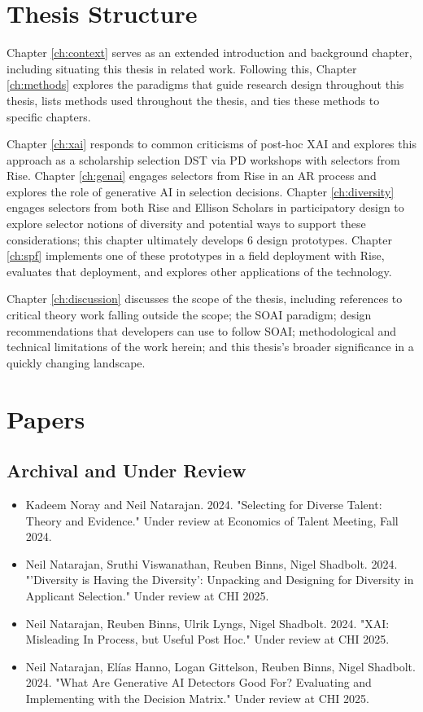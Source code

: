 \section{Thesis Structure}
Chapter \ref{ch:context} serves as an extended introduction and background chapter, including situating this thesis in related work. Following this, Chapter \ref{ch:methods} explores the paradigms that guide research design throughout this thesis, lists methods used throughout the thesis, and ties these methods to specific chapters.

Chapter \ref{ch:xai} responds to common criticisms of post-hoc XAI and explores this approach as a scholarship selection DST via PD workshops with selectors from Rise. Chapter \ref{ch:genai} engages selectors from Rise in an AR process and explores the role of generative AI in selection decisions. Chapter \ref{ch:diversity} engages selectors from both Rise and Ellison Scholars in participatory design to explore selector notions of diversity and potential ways to support these considerations; this chapter ultimately develops 6 design prototypes. Chapter \ref{ch:spf} implements one of these prototypes in a field deployment with Rise, evaluates that deployment, and explores other applications of the technology.

Chapter \ref{ch:discussion} discusses the scope of the thesis, including references to critical theory work falling outside the scope; the SOAI paradigm; design recommendations that developers can use to follow SOAI; methodological and technical limitations of the work herein; and this thesis's broader significance in a quickly changing landscape. 

\section{Papers}
\subsection{Archival and Under Review}
\begin{itemize}
    \item Kadeem Noray and Neil Natarajan. 2024. "Selecting for Diverse Talent: Theory and Evidence." Under review at Economics of Talent Meeting, Fall 2024.
    \item Neil Natarajan, Sruthi Viswanathan, Reuben Binns, Nigel Shadbolt. 2024. "'Diversity is Having the Diversity': Unpacking and Designing for Diversity in Applicant Selection." Under review at CHI 2025.
    \item Neil Natarajan, Reuben Binns, Ulrik Lyngs, Nigel Shadbolt. 2024. "XAI: Misleading In Process, but Useful Post Hoc." Under review at CHI 2025.
    \item Neil Natarajan, Elías Hanno, Logan Gittelson, Reuben Binns, Nigel Shadbolt. 2024. "What Are Generative AI Detectors Good For? Evaluating and Implementing with the Decision Matrix." Under review at CHI 2025.
\end{itemize}

